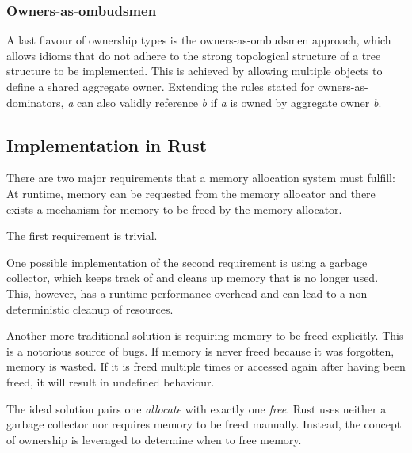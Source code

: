 \documentclass[sigplan,11pt,nonacm]{acmart}
\begin{document}
\cite{ownership-types-survey}


\subsubsection{Owners-as-ombudsmen}

A last flavour of ownership types is the owners-as-ombudsmen approach, which allows idioms that do not adhere to the strong topological structure of a tree structure to be implemented.
This is achieved by allowing multiple objects to define a shared aggregate owner.
Extending the rules stated for owners-as-dominators, \emph{a} can also validly reference \emph{b} if \emph{a} is owned by aggregate owner \emph{b}.

\cite{ownership-types-survey}

\subsection{Implementation in Rust}

There are two major requirements that a memory allocation system must fulfill:
At runtime, memory can be requested from the memory allocator and there exists a mechanism for memory to be freed by the memory allocator.

The first requirement is trivial.

One possible implementation of the second requirement is using a garbage collector, which keeps track of and cleans up memory that is no longer used.
This, however, has a runtime performance overhead and can lead to a non-deterministic cleanup of resources.

Another more traditional solution is requiring memory to be freed explicitly.
This is a notorious source of bugs.
If memory is never freed because it was forgotten, memory is wasted.
If it is freed multiple times or accessed again after having been freed, it will result in undefined behaviour.

The ideal solution pairs one \emph{allocate} with exactly one \emph{free}.
Rust uses neither a garbage collector nor requires memory to be freed manually.
Instead, the concept of ownership is leveraged to determine when to free memory.
\end{document}
